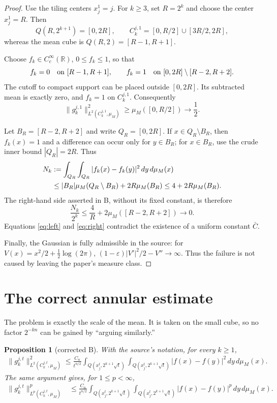 \documentclass[11pt]{article}
\newtheorem{proposition}{Proposition}
\newcommand{\R}{\mathbb R}
\newcommand{\muM}{\mu_M}
\begin{document}
\begin{proof}
Use the tiling centers $x_j^1=j$.  For $k\ge3$, set $R=2^k$ and choose the
center $x_j^1=R$.  Then
\[
 Q(R,2^{k+1})=[0,2R],\qquad
 C_k^{j,1}=[0,R/2]\cup[3R/2,2R],
\]
whereas the mean cube is $Q(R,2)=[R-1,R+1]$.

Choose $f_k\in C_c^\infty(\R)$, $0\le f_k\le1$, so that
\[
 f_k=0\quad\hbox{on }[R-1,R+1],
 \qquad
 f_k=1\quad\hbox{on }[0,2R]\setminus[R-2,R+2].
\]
The cutoff to compact support can be placed outside $[0,2R]$.  Its subtracted
mean is exactly zero, and $f_k=1$ on $C_k^{j,1}$.  Consequently
\begin{equation}\label{eq:left}
 \lVert g_k^{j,1}\rVert_{L^2(C_k^{j,1},\muM)}^2
 \ge \muM([0,R/2])\longrightarrow\frac12.
\end{equation}

Let $B_R=[R-2,R+2]$ and write $Q_R=[0,2R]$.  If $x\in Q_R\setminus B_R$,
then $f_k(x)=1$ and a difference can occur only for $y\in B_R$; for
$x\in B_R$, use the crude inner bound $|Q_R|=2R$.  Thus
\begin{align}
 N_k&:=\int_{Q_R}\int_{Q_R}|f_k(x)-f_k(y)|^2\,dy\,d\muM(x)\notag\\
 &\le |B_R|\muM(Q_R\setminus B_R)+2R\muM(B_R)
 \le 4+2R\muM(B_R).
\end{align}
The right-hand side asserted in B, without its fixed constant, is therefore
\begin{equation}\label{eq:right}
 \frac{N_k}{2^k}\le \frac4R+2\muM([R-2,R+2])\longrightarrow0.
\end{equation}
Equations \eqref{eq:left} and \eqref{eq:right} contradict the existence of
a uniform constant $\bar C$.

Finally, the Gaussian is fully admissible in the source: for
$V(x)=x^2/2+\tfrac12\log(2\pi)$,
$(1-\varepsilon)|V'|^2/2-V''\to\infty$.  Thus the failure is not caused by
leaving the paper's measure class.
\end{proof}

\section{The correct annular estimate}

The problem is exactly the scale of the mean.  It is taken on the small cube,
so no factor $2^{-kn}$ can be gained by ``arguing similarly.''

\begin{proposition}[corrected B]\label{prop:correct}
With the source's notation, for every $k\ge1$,
\begin{align}
 \lVert g_k^{j,t}\rVert_{L^2(C_k^{j,t},\muM)}^2
 \le \frac{C_n}{t^{n/2}}
 \int_{Q(x_j^t,2^{k+1}\sqrt t)}
 \int_{Q(x_j^t,2^{k+1}\sqrt t)}
 |f(x)-f(y)|^2\,dy\,d\muM(x).             \label{eq:correct}
\end{align}
The same argument gives, for $1\le p<\infty$,
\begin{align}
 \lVert g_k^{j,t}\rVert_{L^p(C_k^{j,t},\muM)}^p
 &\le \frac{C_n}{t^{n/2}}
 \int_{Q(x_j^t,2^{k+1}\sqrt t)}
 \int_{Q(x_j^t,2^{k+1}\sqrt t)}
 |f(x)-f(y)|^p\,dy\,d\muM(x).             \label{eq:correctp}
\end{align}
\end{proposition}
\end{document}
